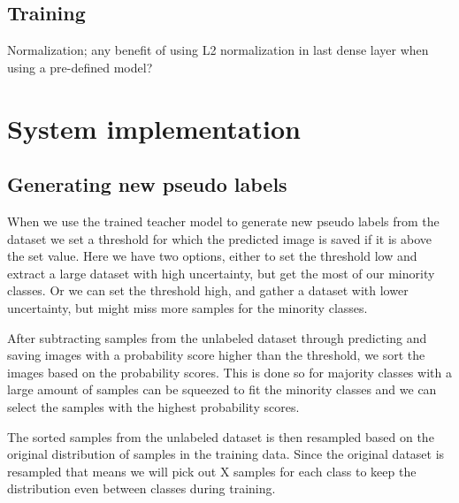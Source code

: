 \documentclass[thesis.tex]{subfiles}
\begin{document}



\subsection{Training}
Normalization; any benefit of using L2 normalization in last dense layer when using a pre-defined model?



\section{System implementation} \label{sec:system_implementation}


\subsection{Generating new pseudo labels}
When we use the trained teacher model to generate new pseudo labels from the dataset we set a threshold for which the predicted image is saved if it is above the set value. Here we have two options, either to set the threshold low and extract a large dataset with high uncertainty, but get the most of our minority classes. Or we can set the threshold high, and gather a dataset with lower uncertainty, but might miss more samples for the minority classes.

After subtracting samples from the unlabeled dataset through predicting and saving images with a probability score higher than the threshold, we sort the images based on the probability scores. This is done so for majority classes with a large amount of samples can be squeezed to fit the minority classes and we can select the samples with the highest probability scores.

The sorted samples from the unlabeled dataset is then resampled based on the original distribution of samples in the training data. Since the original dataset is resampled that means we will pick out X samples for each class to keep the distribution even between classes during training.
\end{document}
